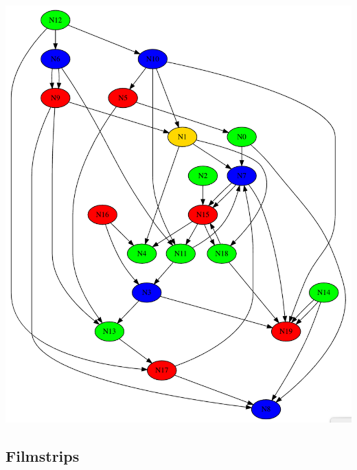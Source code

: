 \documentclass[5p,times]{elsarticle}
\begin{document}
\begin{center}
\includegraphics[width=0.9\columnwidth]{graph_colour}
\end{center}

\subsection{Filmstrips}

\label{sec:filmstrips}
\end{document}
